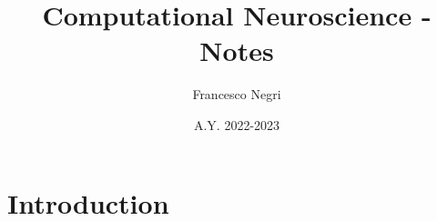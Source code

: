 \documentclass[12pt]{article}
\title{Computational Neuroscience - Notes}
\author{Francesco Negri}
\date{A.Y. 2022-2023}
\begin{document}
\maketitle

\tableofcontents
\newpage

\section{Introduction}
\graphicspath{ {./images/01/} }

\newpage
\end{document}
